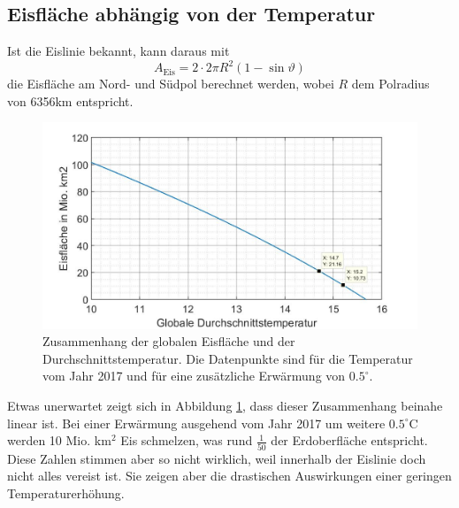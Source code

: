 \begin{refsection}
\subsection{Eisfläche abhängig von der Temperatur}
Ist die Eislinie bekannt, kann daraus mit
\begin{equation} \label{skript:eis:Eisfläche}
	A_\text{Eis}=2\cdot 2\pi R^2(1-\sin\vartheta)
\end{equation}
die Eisfläche am Nord- und Südpol berechnet werden, wobei $R$ dem Polradius von 6356km entspricht.
\begin{figure}
	\centering
	\includegraphics[width=14cm]{eis/Eisflaeche_abh_von_der_Temperatur.jpg}
	\caption{Zusammenhang der globalen Eisfläche und der Durchschnittstemperatur. Die Datenpunkte sind für die Temperatur vom Jahr 2017 und für eine zusätzliche Erwärmung von $0.5^{\circ}$.}
	\label{skript:eis:fig:Eisflaeche_abh_von_der_Temperatur}
\end{figure}
Etwas unerwartet zeigt sich in Abbildung \ref{skript:eis:fig:Eisflaeche_abh_von_der_Temperatur}, dass dieser Zusammenhang beinahe linear ist. Bei einer Erwärmung ausgehend vom Jahr 2017 um weitere $0.5^{\circ}$C werden 10 Mio. km$^2$ Eis schmelzen, was rund $\tfrac{1}{50}$ der Erdoberfläche entspricht. Diese Zahlen stimmen aber so nicht wirklich, weil innerhalb der Eislinie doch nicht alles vereist ist. Sie zeigen aber die drastischen Auswirkungen einer geringen Temperaturerhöhung.

\end{refsection}
